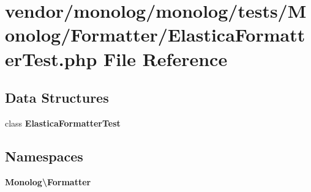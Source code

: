 \section{vendor/monolog/monolog/tests/\+Monolog/\+Formatter/\+Elastica\+Formatter\+Test.php File Reference}
\label{_elastica_formatter_test_8php}
\subsection*{Data Structures}
\begin{DoxyCompactItemize}
\item 
class {\bf Elastica\+Formatter\+Test}
\end{DoxyCompactItemize}
\subsection*{Namespaces}
\begin{DoxyCompactItemize}
\item 
 {\bf Monolog\textbackslash{}\+Formatter}
\end{DoxyCompactItemize}
